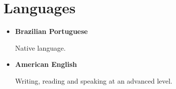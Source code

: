 \section{Languages}

\begin{itemize}
  \item \textbf{Brazilian Portuguese}

    Native language.

  \item \textbf{American English}

    Writing, reading and speaking at an advanced level.

\end{itemize}
